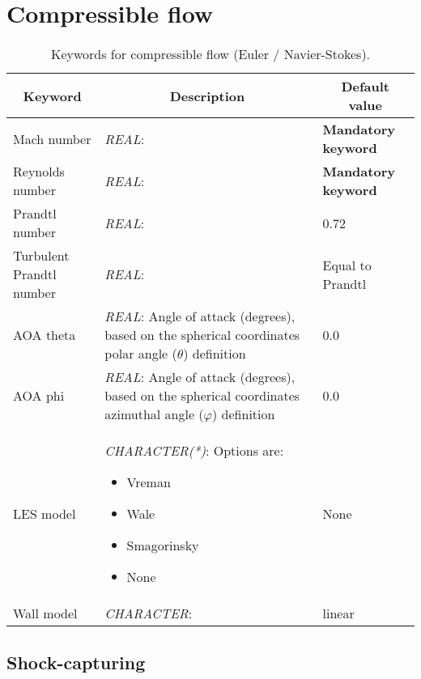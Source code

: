 \documentclass[a4paper,10pt]{report}
\begin{document}
\section{Compressible flow}

\begin{table}[htbp]
\caption{Keywords for compressible flow (Euler / Navier-Stokes).}
\begin{tabular}{|l|p{10cm}|p{2.2cm}|}
\hline
\multicolumn{1}{|c|}{Keyword} & \multicolumn{1}{c|}{Description} & \multicolumn{1}{c|}{Default value} \\ \hline

Mach number					& \textit{REAL}:  & \textbf{Mandatory keyword} \\ \hline

Reynolds number				& \textit{REAL}:  & \textbf{Mandatory keyword} \\ \hline

Prandtl number				& \textit{REAL}:  & 0.72 \\ \hline

Turbulent Prandtl number	& \textit{REAL}:  & Equal to Prandtl \\ \hline

    AOA theta             & \textit{REAL}: Angle of attack (degrees), based on the spherical coordinates polar angle ($\theta$) definition  & 0.0 \\ \hline

    AOA phi               & \textit{REAL}: Angle of attack (degrees), based on the spherical coordinates azimuthal angle ($\varphi$) definition  & 0.0 \\ \hline

LES model					& \textit{CHARACTER(*)}: Options are:
\begin{itemize}
\item Vreman
\item Wale    
\item Smagorinsky
\item None
\end{itemize}
 & None \\ \hline

Wall model					& \textit{CHARACTER}:  & linear \\ \hline

\end{tabular}
\label{tab:compressibleFlowkey}
\end{table}

\subsection{Shock-capturing}
\end{document}
